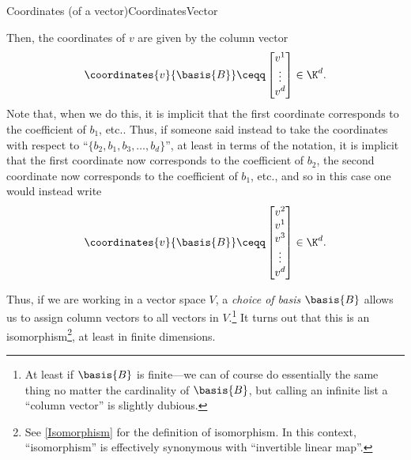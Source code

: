 \begin{dfn}{Coordinates (of a vector)}{CoordinatesVector}
\begin{rmk}
		Then, the coordinates of $v$ are given by the column vector
		\begin{equation}
			\coordinates{v}{\basis{B}}\ceqq \begin{bmatrix}v^1 \\ \vdots \\ v^d\end{bmatrix}\in \K ^d.
		\end{equation}
		Note that, when we do this, it is implicit that the first coordinate corresponds to the coefficient of $b_1$, etc..  Thus, if someone said instead to take the coordinates with respect to ``$\{ b_2,b_1,b_3,\ldots ,b_d\}$'', at least in terms of the notation, it is implicit that the first coordinate now corresponds to the coefficient of $b_2$, the second coordinate now corresponds to the coefficient of $b_1$, etc., and so in this case one would instead write
		\begin{equation}
			\coordinates{v}{\basis{B}}\ceqq \begin{bmatrix}v^2 \\ v^1 \\ v^3 \\ \vdots \\ v^d\end{bmatrix}\in \K ^d.
		\end{equation}
	\end{rmk}
\end{dfn}
Thus, if we are working in a vector space $V$, a \emph{choice of basis $\basis{B}$} allows us to assign column vectors to all vectors in $V$.\footnote{At least if $\basis{B}$ is finite---we can of course do essentially the same thing no matter the cardinality of $\basis{B}$, but calling an infinite list a ``column vector'' is slightly dubious.}  It turns out that this is an isomorphism\footnote{See \cref{Isomorphism} for the definition of isomorphism.  In this context, ``isomorphism'' is effectively synonymous with ``invertible linear map''.}, at least in finite dimensions.
